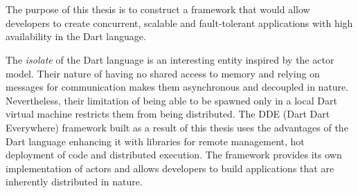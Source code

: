 \chapter{\abstractname}

  The purpose of this thesis is to construct a framework that would allow developers to create concurrent, scalable and fault-tolerant applications with high availability in the Dart language.

  The \emph{isolate} of the Dart language is an interesting entity inspired by the actor model. Their nature of having no shared access to memory and relying on messages for communication makes them asynchronous and decoupled in nature. Nevertheless, their limitation of being able to be spawned only in a local Dart virtual machine restricts them from being distributed. The DDE (Dart Dart Everywhere) framework built as a result of this thesis uses the advantages of the Dart language enhancing it with libraries for remote management, hot deployment of code and distributed execution. The framework provides its own implementation of actors and allows developers to build applications that are inherently distributed in nature.
